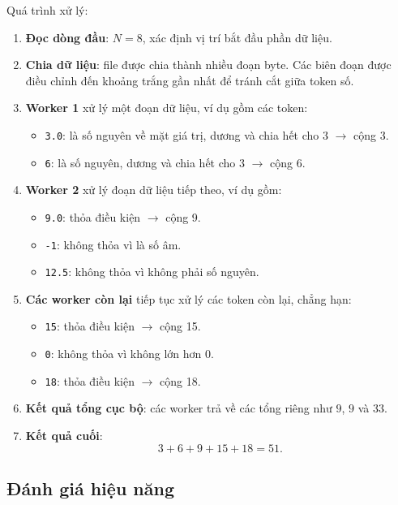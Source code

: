 \documentclass[12pt,a4paper]{article}
\begin{document}
Quá trình xử lý:
\begin{enumerate}
  \item \textbf{Đọc dòng đầu}: $N=8$, xác định vị trí bắt đầu phần dữ liệu.

  \item \textbf{Chia dữ liệu}: file được chia thành nhiều đoạn byte. 
  Các biên đoạn được điều chỉnh đến khoảng trắng gần nhất để tránh cắt giữa token số.

  \item \textbf{Worker 1} xử lý một đoạn dữ liệu, ví dụ gồm các token:
  \begin{itemize}
    \item \texttt{3.0}: là số nguyên về mặt giá trị, dương và chia hết cho 3 $\rightarrow$ cộng 3.
    \item \texttt{6}: là số nguyên, dương và chia hết cho 3 $\rightarrow$ cộng 6.
  \end{itemize}

  \item \textbf{Worker 2} xử lý đoạn dữ liệu tiếp theo, ví dụ gồm:
  \begin{itemize}
    \item \texttt{9.0}: thỏa điều kiện $\rightarrow$ cộng 9.
    \item \texttt{-1}: không thỏa vì là số âm.
    \item \texttt{12.5}: không thỏa vì không phải số nguyên.
  \end{itemize}

  \item \textbf{Các worker còn lại} tiếp tục xử lý các token còn lại, chẳng hạn:
  \begin{itemize}
    \item \texttt{15}: thỏa điều kiện $\rightarrow$ cộng 15.
    \item \texttt{0}: không thỏa vì không lớn hơn 0.
    \item \texttt{18}: thỏa điều kiện $\rightarrow$ cộng 18.
  \end{itemize}

  \item \textbf{Kết quả tổng cục bộ}: các worker trả về các tổng riêng như $9$, $9$ và $33$.

  \item \textbf{Kết quả cuối}: 
  \[
    3 + 6 + 9 + 15 + 18 = 51.
  \]
\end{enumerate}

\subsection{Đánh giá hiệu năng}
\end{document}
